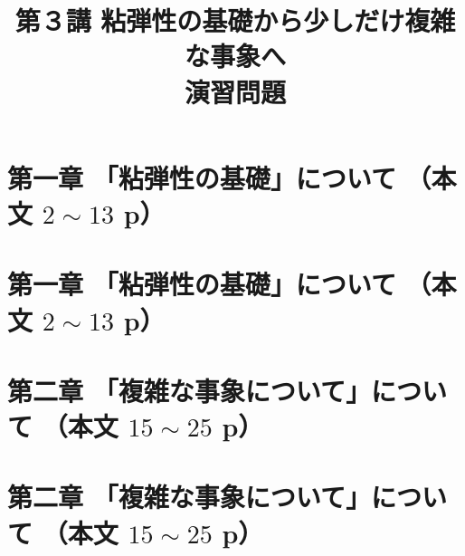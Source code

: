 \documentclass[uplatex,dvipdfmx,a4paper,11pt]{jsreport}
\title{第３講 粘弾性の基礎から少しだけ複雑な事象へ\\演習問題}
\author{}
\date{}
\begin{document}
\maketitle

\section*{第一章 「粘弾性の基礎」について （本文 $2\sim13$ p）}

\clearpage
\section*{第一章 「粘弾性の基礎」について （本文 $2\sim13$ p）}


\clearpage
\section*{第二章 「複雑な事象について」について （本文 $15\sim25$ p）}

\clearpage
\section*{第二章 「複雑な事象について」について （本文 $15\sim25$ p）}

\end{document}
